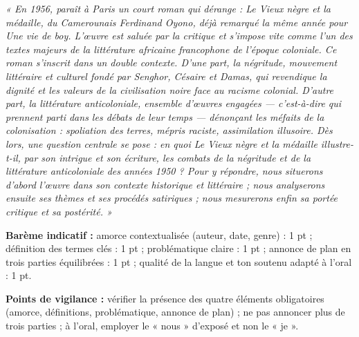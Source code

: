 \documentclass[11pt]{article}
\begin{document}
\begin{corrige}
\textit{« En 1956, paraît à Paris un court roman qui dérange : Le Vieux nègre et la médaille, du Camerounais Ferdinand Oyono, déjà remarqué la même année pour Une vie de boy. L'œuvre est saluée par la critique et s'impose vite comme l'un des textes majeurs de la littérature africaine francophone de l'époque coloniale. Ce roman s'inscrit dans un double contexte. D'une part, la négritude, mouvement littéraire et culturel fondé par Senghor, Césaire et Damas, qui revendique la dignité et les valeurs de la civilisation noire face au racisme colonial. D'autre part, la littérature anticoloniale, ensemble d'œuvres engagées — c'est-à-dire qui prennent parti dans les débats de leur temps — dénonçant les méfaits de la colonisation : spoliation des terres, mépris raciste, assimilation illusoire. Dès lors, une question centrale se pose : en quoi Le Vieux nègre et la médaille illustre-t-il, par son intrigue et son écriture, les combats de la négritude et de la littérature anticoloniale des années 1950 ? Pour y répondre, nous situerons d'abord l'œuvre dans son contexte historique et littéraire ; nous analyserons ensuite ses thèmes et ses procédés satiriques ; nous mesurerons enfin sa portée critique et sa postérité. »}

\textbf{Barème indicatif :} amorce contextualisée (auteur, date, genre) : 1 pt ; définition des termes clés : 1 pt ; problématique claire : 1 pt ; annonce de plan en trois parties équilibrées : 1 pt ; qualité de la langue et ton soutenu adapté à l'oral : 1 pt.

\textbf{Points de vigilance :} vérifier la présence des quatre éléments obligatoires (amorce, définitions, problématique, annonce de plan) ; ne pas annoncer plus de trois parties ; à l'oral, employer le « nous » d'exposé et non le « je ».
\end{corrige}
\end{document}
